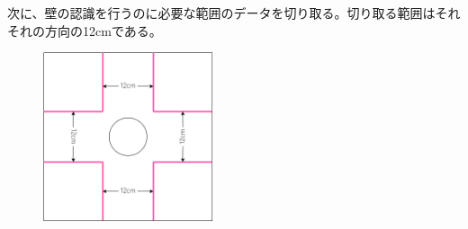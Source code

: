 \documentclass[dvipdfmx,a4paper]{jsarticle}
\begin{document}
    \noindent
    次に、壁の認識を行うのに必要な範囲のデータを切り取る。切り取る範囲はそれそれの方向の12cmである。
    \begin{figure}[H]
      \centering
      \includegraphics[width=50mm]{Photo/image2.drawio.png}
      \caption{}
    \end{figure}
    
\end{document}
